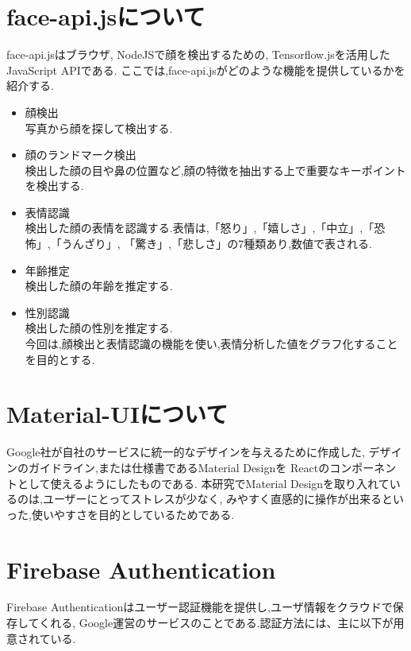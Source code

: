 \section{face-api.jsについて}
\label{sec:reference_bib}
face-api.jsはブラウザ, NodeJSで顔を検出するための,
Tensorflow.jsを活用したJavaScript APIである.
ここでは,face-api.jsがどのような機能を提供しているかを紹介する.
\begin{itemize}
	\item 顔検出 \\
	写真から顔を探して検出する. \\

	\item 顔のランドマーク検出 \\
	検出した顔の目や鼻の位置など,顔の特徴を抽出する上で重要なキーポイントを検出する. \\

	\item 表情認識 \\
	検出した顔の表情を認識する.表情は,「怒り」,「嬉しさ」,「中立」,「恐怖」,「うんざり」,
	「驚き」,「悲しさ」の7種類あり,数値で表される. \\

	\item 年齢推定 \\
	検出した顔の年齢を推定する. \\

	\item 性別認識 \\
	検出した顔の性別を推定する. \\

	今回は,顔検出と表情認識の機能を使い,表情分析した値をグラフ化することを目的とする.
\end{itemize}
	
\section{Material-UIについて}
\label{sec:reference_material}
Google社が自社のサービスに統一的なデザインを与えるために作成した,
デザインのガイドライン,または仕様書であるMaterial Designを
Reactのコンポーネントとして使えるようにしたものである.
本研究でMaterial Designを取り入れているのは,ユーザーにとってストレスが少なく,
みやすく直感的に操作が出来るといった,使いやすさを目的としているためである.

\section{Firebase Authentication}
\label{sec:reference_auth}
Firebase Authenticationはユーザー認証機能を提供し,ユーザ情報をクラウドで保存してくれる,
Google運営のサービスのことである.認証方法には、主に以下が用意されている.

